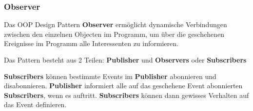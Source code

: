 \subsubsection{Observer}
Das OOP Design Pattern \textbf{Observer} ermöglicht dynamische Verbindungen zwischen den einzelnen 
Objecten im Programm, um über die geschehenen Ereignisse im Programm alle Interessenten 
zu informieren.

Das Pattern besteht aus 2 Teilen: \textbf{Publisher} und \textbf{Observers} oder \textbf{Subscribers}

\textbf{Subscribers} können bestimmte Events im \textbf{Publisher} abonnieren und disabonnieren.
\textbf{Publisher} informiert alle auf das geschehene Event abonnierten \textbf{Subscribers}, wenn es auftritt. 
\textbf{Subscribers} können dann gewisses Verhalten auf das Event definieren.
